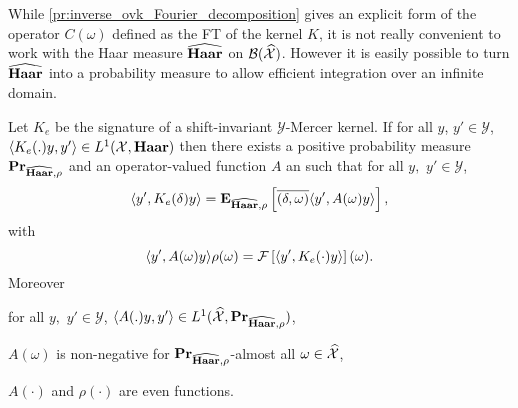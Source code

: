 While \cref{pr:inverse_ovk_Fourier_decomposition} gives an explicit form of the operator $C(\omega)$ defined as the \acl{FT} of the kernel $K$, it is not really convenient to work with the Haar measure $\widehat{\mathbf{Haar}}$ on $\mathcal{B}(\widehat{\mathcal{X}})$. However it is easily possible to turn $\widehat{\mathbf{Haar}}$ into a probability measure to allow efficient integration over an infinite domain.
\begin{proposition}
\label{pr:spectral}
Let $K_e$ be the signature of a shift-invariant $\mathcal{Y}$-Mercer kernel. If for all $y$, $y' \in\mathcal{Y}$, $\langle K_e(.)y,y'\rangle\in L^1(\mathcal{X},\mathbf{Haar})$ then there exists a positive probability measure ${\mathbf{{Pr}}}_{\widehat{\mathbf{Haar}},\rho}$ and an operator-valued function $A$ an such that for all $y,$ $y'\in\mathcal{Y}$,
\begin{dmath*}
\inner{y', K_e(\delta)y}
=\expectation_{\dual{\Haar},\rho}\left[\conj{\pairing{\delta, \omega}}\inner{y', A(\omega)y}\right],
\end{dmath*}
with
\begin{dmath}
\label{eq:comega}
\inner{y', A(\omega)y}\rho(\omega) = \FT{\inner{y', K_e(\cdot)y}}(\omega).
\end{dmath}
Moreover
\begin{propenum}
\item for all $y,$ $y'\in\mathcal{Y}$, $\langle A(.)y,y'\rangle\in L^1(\widehat{\mathcal{X}}, {\mathbf{{Pr}}}_{\widehat{\mathbf{Haar}},\rho})$,
\item $A(\omega)$ is non-negative for ${\mathbf{{Pr}}}_{\widehat{\mathbf{Haar}},\rho}$-almost all $\omega\in\widehat{\mathcal{X}}$,
\item $A(\cdot)$ and $\rho(\cdot)$ are even functions.
\end{propenum}
\end{proposition}
